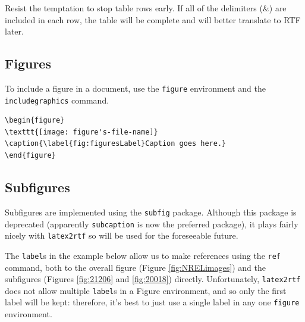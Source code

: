 \documentclass[12pt,letterpaper]{report}
\begin{document}
Resist the temptation to stop table rows early. If all of the delimiters  (\&) are included in each row, the table will be complete and will better translate to RTF later.

\subsection{Figures}
To include a figure in a document, use the \texttt{figure} environment and the \texttt{includegraphics} command.

\begin{verbatim}
\begin{figure}
\texttt{[image: figure's-file-name]}
\caption{\label{fig:figuresLabel}Caption goes here.}
\end{figure}
\end{verbatim}

\subsection{Subfigures}
Subfigures are implemented using the \texttt{subfig} package. Although this package is deprecated (apparently \texttt{subcaption} is now the preferred package), it plays fairly nicely with \texttt{latex2rtf} so will be used for the foreseeable future. 

The \texttt{label}s in the example below allow us to make references using the \texttt{ref} command, both to the overall figure (Figure \ref{fig:NRELimages}) and the subfigures (Figures \ref{fig:21206} and \ref{fig:20018}) directly. Unfortunately, \texttt{latex2rtf} does not allow multiple \texttt{label}s in a Figure environment, and so only the first label will be kept: therefore, it's best to just use a single label in any one \texttt{figure} environment.
\end{document}

